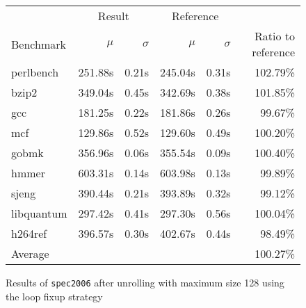 \begin{figure}[h]
    \begin{center}
        \begin{tabular}{lrrrrr}
            \toprule
            & \multicolumn{2}{c}{Result} & \multicolumn{2}{c}{Reference}\\
            Benchmark & $\mu$ & $\sigma$ & $\mu$ & $\sigma$ & Ratio to reference\\
            \midrule
            perlbench & 251.88s & 0.21s & 245.04s & 0.31s & 102.79\%\\
            bzip2 & 349.04s & 0.45s & 342.69s & 0.38s & 101.85\%\\
            gcc & 181.25s & 0.22s & 181.86s & 0.26s & 99.67\%\\
            mcf & 129.86s & 0.52s & 129.60s & 0.49s & 100.20\%\\
            gobmk & 356.96s & 0.06s & 355.54s & 0.09s & 100.40\%\\
            hmmer & 603.31s & 0.14s & 603.98s & 0.13s & 99.89\%\\
            sjeng & 390.44s & 0.21s & 393.89s & 0.32s & 99.12\%\\
            libquantum & 297.42s & 0.41s & 297.30s & 0.56s & 100.04\%\\
            h264ref & 396.57s & 0.30s & 402.67s & 0.44s & 98.49\%\\
            \midrule
            Average & & & & & 100.27\%\\
            \bottomrule
        \end{tabular}
    \end{center}
    \caption{Results of \texttt{spec2006} after unrolling with maximum size 128 using the loop fixup strategy}
    \label{fig:eval:perf:loop:128}
\end{figure}
